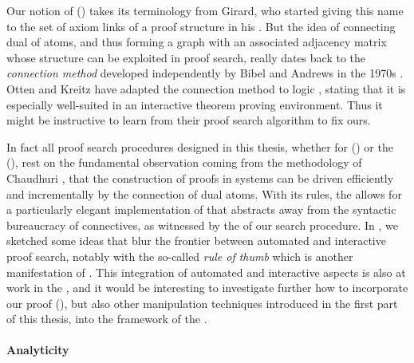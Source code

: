 \begin{scope}
Our notion of \emph{} () takes its terminology from
Girard, who started giving this name to the set of axiom links of a proof
structure in his  . But the idea of connecting dual
 of atoms, and thus forming a graph with an associated adjacency
matrix whose structure can be exploited in proof search, really dates back to
the \emph{connection method} developed independently by Bibel and Andrews in the
1970s . Otten and Kreitz have adapted the connection method
to  logic , stating that it is
especially well-suited in an interactive theorem proving environment. Thus it
might be instructive to learn from their proof search algorithm to fix ours.

In fact all proof search procedures designed in this thesis, whether for  () or the 
(), rest on the fundamental observation coming from the
 methodology of Chaudhuri , that the
construction of proofs in  systems can be driven efficiently and
incrementally by the connection of dual atoms. With its  rules, the
 allows for a particularly elegant implementation of  that abstracts away from the syntactic bureaucracy of 
connectives, as witnessed by the  of our search procedure. In
, we sketched some ideas that blur the frontier
between automated and interactive proof search, notably with the so-called
\emph{rule of thumb} which is another manifestation of . This
integration of automated and interactive aspects is also at work in the , and it would be interesting to investigate further how to incorporate
our  proof  (), but also other 
manipulation techniques introduced in the first part of this thesis, into the
 framework of the .

\paragraph{Analyticity}


\end{scope}
